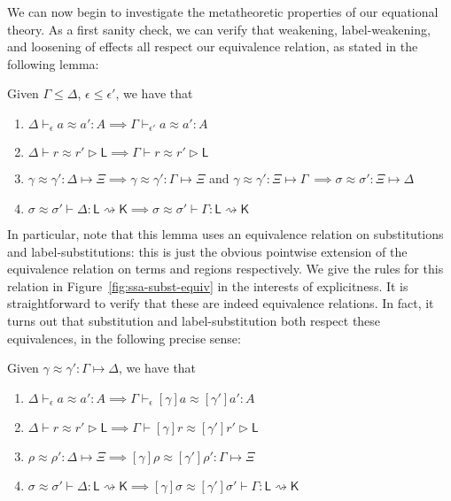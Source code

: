 \documentclass[acmsmall,screen,review]{acmart}
\newcounter{todos}
\newcommand{\todo}[1]{\stepcounter{todos} \textcolor{red}{\textbf{TODO \arabic{todos}}: #1}}
\newcommand{\ms}[1]{\ensuremath{\mathsf{#1}}}
\newcommand{\issubst}[3]{#1: #2 \mapsto #3}
\newcommand{\lbsubst}[4]{#1 \vdash #2: #3 \rightsquigarrow #4}
\newcommand{\teqv}{\approx}
\newcommand{\tmeq}[5]{#1 \vdash_{#2} #3 \teqv #4 : {#5}}
\newcommand{\lbeq}[4]{#1 \vdash #2 \teqv #3 \rhd {#4}}
\newcommand{\tmseq}[4]{\issubst{#1 \teqv #2}{#3}{#4}}
\newcommand{\lbseq}[5]{\lbsubst{#1 \teqv #2}{#3}{#4}{#5}}
\begin{document}
We can now begin to investigate the metatheoretic properties of our equational theory. As a first
sanity check, we can verify that weakening, label-weakening, and loosening of effects all respect
our equivalence relation, as stated in the following lemma:
\begin{lemma}
  Given $\Gamma \leq \Delta$, $\epsilon \leq \epsilon'$, we have that
  \begin{enumerate}[label=(\alph*)]
    \item $\tmeq{\Delta}{\epsilon}{a}{a'}{A} \implies \tmeq{\Gamma}{\epsilon'}{a}{a'}{A}$
    \item $\lbeq{\Delta}{r}{r'}{\ms{L}} \implies \lbeq{\Gamma}{r}{r'}{\ms{L}}$
    \item $\tmseq{\gamma}{\gamma'}{\Delta}{\Xi} 
      \implies \tmseq{\gamma}{\gamma'}{\Gamma}{\Xi}$ and
      $\tmseq{\gamma}{\gamma'}{\Xi}{\Gamma}\
      \implies \tmseq{\sigma}{\sigma'}{\Xi}{\Delta}$
    \item $\lbseq{\sigma}{\sigma'}{\Delta}{\ms{L}}{\ms{K}}
      \implies \lbseq{\sigma}{\sigma'}{\Gamma}{\ms{L}}{\ms{K}}$
  \end{enumerate}
\end{lemma}
In particular, note that this lemma uses an equivalence relation on substitutions and
label-substitutions: this is just the obvious pointwise extension of the equivalence relation on
terms and regions respectively. We give the rules for this relation in
Figure~\ref{fig:ssa-subst-equiv} in the interests of explicitness. It is straightforward to verify
that these are indeed equivalence relations.  In fact, it turns out that substitution and
label-substitution both respect these equivalences, in the following precise sense:
\begin{lemma}
  Given $\tmseq{\gamma}{\gamma'}{\Gamma}{\Delta}$, we have that
  \begin{enumerate}[label=(\alph*)]
    \item $\tmeq{\Delta}{\epsilon}{a}{a'}{A} 
      \implies \tmeq{\Gamma}{\epsilon}{[\gamma]a}{[\gamma']a'}{A}$
    \item $\lbeq{\Delta}{r}{r'}{\ms{L}} 
      \implies \lbeq{\Gamma}{[\gamma]r}{[\gamma']r'}{\ms{L}}$
    \item $\tmseq{\rho}{\rho'}{\Delta}{\Xi}
      \implies \tmseq{[\gamma]\rho}{[\gamma']\rho'}{\Gamma}{\Xi}$
    \item $\lbseq{\sigma}{\sigma'}{\Delta}{\ms{L}}{\ms{K}}
      \implies \lbseq{[\gamma]\sigma}{[\gamma']\sigma'}{\Gamma}{\ms{L}}{\ms{K}}$
  \end{enumerate}
\end{lemma}
\end{document}
